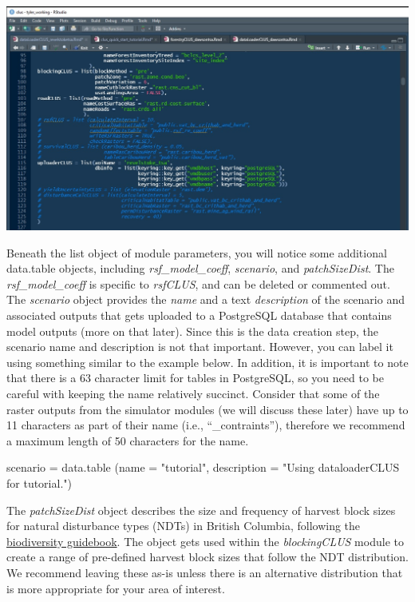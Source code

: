 \documentclass[
]{article}
\newenvironment{Shaded}{\begin{snugshade}}{\end{snugshade}}
\newcommand{\AttributeTok}[1]{\textcolor[rgb]{0.77,0.63,0.00}{#1}}
\newcommand{\FunctionTok}[1]{\textcolor[rgb]{0.00,0.00,0.00}{#1}}
\newcommand{\NormalTok}[1]{#1}
\newcommand{\OtherTok}[1]{\textcolor[rgb]{0.56,0.35,0.01}{#1}}
\newcommand{\StringTok}[1]{\textcolor[rgb]{0.31,0.60,0.02}{#1}}
\begin{document}
\includegraphics{images/code_comment.jpg}

Beneath the list object of module parameters, you will notice some
additional data.table objects, including \emph{rsf\_model\_coeff},
\emph{scenario}, and \emph{patchSizeDist}. The \emph{rsf\_model\_coeff}
is specific to \emph{rsfCLUS}, and can be deleted or commented out. The
\emph{scenario} object provides the \emph{name} and a text
\emph{description} of the scenario and associated outputs that gets
uploaded to a PostgreSQL database that contains model outputs (more on
that later). Since this is the data creation step, the scenario name and
description is not that important. However, you can label it using
something similar to the example below. In addition, it is important to
note that there is a 63 character limit for tables in PostgreSQL, so you
need to be careful with keeping the name relatively succinct. Consider
that some of the raster outputs from the simulator modules (we will
discuss these later) have up to 11 characters as part of their name
(i.e., ``\_contraints''), therefore we recommend a maximum length of 50
characters for the name.

\begin{Shaded}
\begin{Highlighting}[]
\NormalTok{scenario }\OtherTok{=} \FunctionTok{data.table}\NormalTok{ (}\AttributeTok{name =} \StringTok{"tutorial"}\NormalTok{, }
                       \AttributeTok{description =} \StringTok{"Using dataloaderCLUS for tutorial."}\NormalTok{)}
\end{Highlighting}
\end{Shaded}

The \emph{patchSizeDist} object describes the size and frequency of
harvest block sizes for natural disturbance types (NDTs) in British
Columbia, following the
\href{https://www.for.gov.bc.ca/hfd/library/documents/bib19715.pdf}{biodiversity
guidebook}. The object gets used within the \emph{blockingCLUS} module
to create a range of pre-defined harvest block sizes that follow the NDT
distribution. We recommend leaving these as-is unless there is an
alternative distribution that is more appropriate for your area of
interest.
\end{document}
